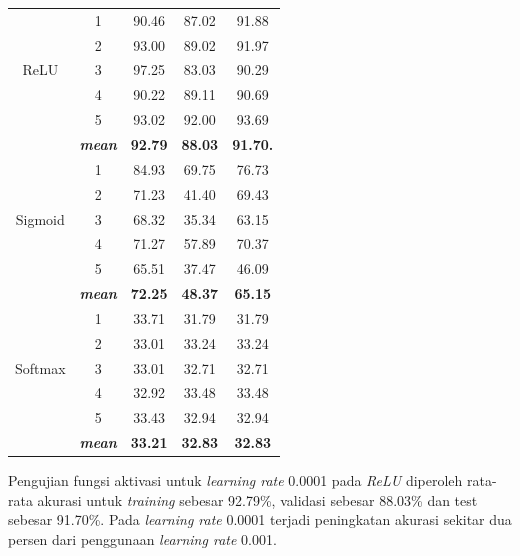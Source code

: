 \begin{table}[H]
\begin{table}[H]
\begin{tabular}{ccccc}
            \midrule
            \multirow{5}{*}{ReLU} 

            & 1 & 90.46 & 87.02 & 91.88 \\
            & 2 & 93.00 & 89.02 & 91.97 \\
            & 3 & 97.25 & 83.03 & 90.29 \\
            & 4 & 90.22 & 89.11 & 90.69 \\
            & 5 & 93.02 & 92.00 & 93.69 \\ 
            & \textit{\textbf{mean}}& \textbf{92.79} & \textbf{88.03} &\textbf{91.70.} \\ 
            \hline


            \multirow{5}{*}{Sigmoid}
            & 1 &  84.93 & 69.75 & 76.73  \\
            & 2 &  71.23 & 41.40 & 69.43 \\
            & 3 &  68.32 & 35.34 & 63.15 \\
            & 4 &  71.27 & 57.89 & 70.37 \\
            & 5 &  65.51 & 37.47 & 46.09 \\
            & \textit{\textbf{mean}}& \textbf{72.25} & \textbf{48.37} &\textbf{65.15} \\ 
                        \hline
    
            \multirow{5}{*}{Softmax}
            & 1 & 33.71 & 31.79 & 31.79 \\
            & 2 & 33.01 & 33.24 & 33.24 \\
            & 3 & 33.01 & 32.71 & 32.71  \\
            & 4 & 32.92 & 33.48 & 33.48 \\
            & 5 & 33.43 & 32.94 & 32.94 \\
            & \textit{\textbf{mean}}& \textbf{33.21} & \textbf{32.83} &\textbf{32.83} \\ 

            \bottomrule
        \end{tabular}
        \label{Pengujian Learning Rate 0.0001 }
    \end{table}

    Pengujian fungsi aktivasi untuk \textit{learning rate} 0.0001 
    pada \textit{ReLU} diperoleh rata-rata akurasi untuk \textit{training} sebesar 92.79\%, validasi sebesar 88.03\% dan test sebesar 91.70\%. Pada \textit{learning rate} 0.0001 terjadi peningkatan akurasi sekitar dua persen dari penggunaan \textit{learning rate} 0.001. 
    

\end{table}
